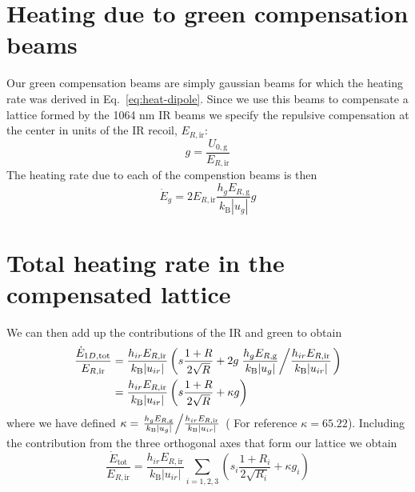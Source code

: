 \section{Heating due to green compensation beams}


Our green compensation beams are simply gaussian beams for which the heating
rate was derived in Eq.~\ref{eq:heat-dipole}.   Since we use this beams to
compensate a lattice formed by the 1064 nm IR beams we specify the
repulsive compensation at the center in units of the IR recoil,
$E_{R,\text{ir}}$:
\begin{equation} 
  g = \frac{U_{0,\text{g}}}{ E_{R,\text{ir}}}
\end{equation}
The heating rate due to each of the compenstion beams is then 
\begin{equation}
\boxed{
 \dot{E}_{g} = 
   2 E_{R,\text{ir}} \frac{ h_{g} E_{R,\text{g}} }{k_{\text{B}}|u_{g}|} g }
\end{equation}

\section{Total heating rate in the compensated lattice}

We can then add up the contributions of the IR and green to obtain 
\begin{equation}
\begin{split}
 \frac{\dot{E}_{1D,\text{tot}}}{ E_{R,\text{ir}} } & =
 \frac{ h_{ir} E_{R,\text{ir}} }{k_{\text{B}}|u_{ir}|} 
  \left(
  s \frac{1+R}{2\sqrt{R}}  + 
  2g
 \left. 
 \frac{ h_{g} E_{R,\text{g}} }{k_{\text{B}}|u_{g}|} \middle /
 \frac{ h_{ir} E_{R,\text{ir}} }{k_{\text{B}}|u_{ir}|} \right.
\right) \\
  & = 
 \frac{ h_{ir} E_{R,\text{ir}} }{k_{\text{B}}|u_{ir}|} 
  \left(
  s \frac{1+R}{2\sqrt{R}}  +
  \kappa g  
\right) \\
\end{split}  
\end{equation}
where we have defined $\kappa = \left.  \frac{ h_{g} E_{R,\text{g}}
}{k_{\text{B}}|u_{g}|} \middle / \frac{ h_{ir} E_{R,\text{ir}}
}{k_{\text{B}}|u_{ir}|} \right.$ ( For reference $\kappa = 65.22$).  Including
the contribution from the three orthogonal axes that form our lattice we
obtain
\begin{equation}
 \frac{ \dot{E}_{\text{tot}} }{ E_{R,\text{ir}} }  = 
 \frac{ h_{ir} E_{R,\text{ir}} }{k_{\text{B}}|u_{ir}|}
  \sum_{i=1,2,3} 
  \left(
  s_{i} \frac{1+R_{i}}{2\sqrt{R_{i}}}  + 
  \kappa g_{i} \right)
\end{equation} 

